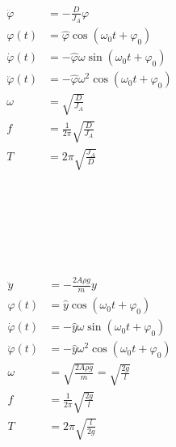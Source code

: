 \begin{boxleft}
\\
\\
\\
\\
\end{boxleft}\begin{boxrightshaded}
\begin{align}
\ddot{\varphi}&=-\frac{D}{J_A}\varphi\\
\varphi(t)&=\hat{\varphi}\cos(\omega_0 t+\varphi_0)\\
\dot{\varphi}(t)&=-\hat{\varphi}\omega\sin(\omega_0 t+\varphi_0)\\
\ddot{\varphi}(t)&=-\hat{\varphi}\omega^2\cos(\omega_0 t+\varphi_0)\\
\omega&=\sqrt{\frac{D}{J_A}}\\
f&=\frac{1}{2\pi}\sqrt{\frac{D}{J_A}}\\
T&=2\pi\sqrt{\frac{J_A}{D}}
\end{align}
\end{boxrightshaded}

\begin{boxleft}
\\
\\
\\
\\
\\
\end{boxleft}\begin{boxrightshaded}
\begin{align}
\ddot{y}&=-\frac{2A\rho g}{m}y\\
\varphi(t)&=\hat{y}\cos(\omega_0 t+\varphi_0)\\
\dot{\varphi}(t)&=-\hat{y}\omega\sin(\omega_0 t+\varphi_0)\\
\ddot{\varphi}(t)&=-\hat{y}\omega^2\cos(\omega_0 t+\varphi_0)\\
\omega&=\sqrt{\frac{2A\rho g}{m}}=\sqrt{\frac{2g}{l}}\\
f&=\frac{1}{2\pi}\sqrt{\frac{2g}{l}}\\
T&=2\pi\sqrt{\frac{l}{2g}}
\end{align}
\end{boxrightshaded}

